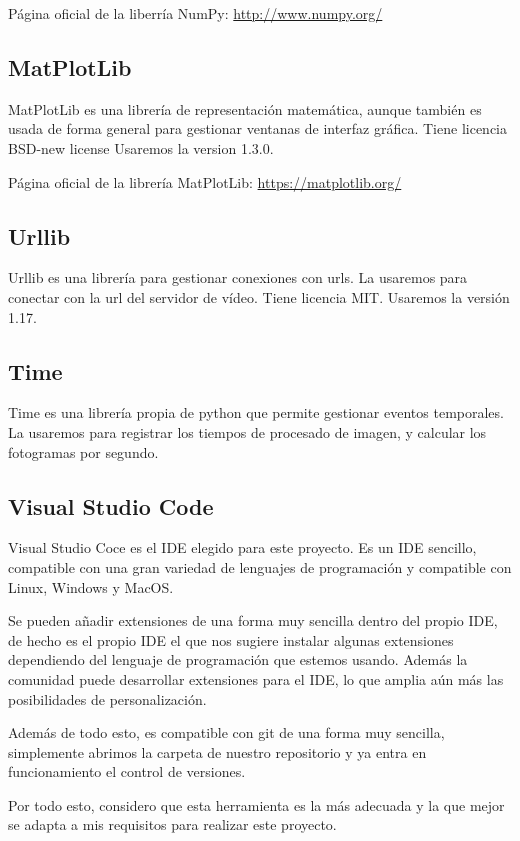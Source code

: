 Página oficial de la liberría NumPy: \url{http://www.numpy.org/}

\subsection{MatPlotLib}
MatPlotLib es una librería de representación matemática, aunque también es usada de forma general para gestionar ventanas de interfaz gráfica.
Tiene licencia BSD-new license
Usaremos la version 1.3.0.

Página oficial de la librería MatPlotLib: \url{https://matplotlib.org/}

\subsection{Urllib}
Urllib es una librería para gestionar conexiones con urls. La usaremos para conectar con la url del servidor de vídeo. 
Tiene licencia MIT.
Usaremos la versión 1.17.

\subsection{Time}
Time es una librería propia de python que permite gestionar eventos temporales. La usaremos para registrar los tiempos de procesado de imagen, y calcular los fotogramas por segundo. 


\subsection{Visual Studio Code}
Visual Studio Coce es el IDE elegido para este proyecto. Es un IDE sencillo, compatible con una gran variedad de lenguajes de programación y compatible con Linux, Windows y MacOS.
 
Se pueden añadir extensiones de una forma muy sencilla dentro del propio IDE, de hecho es el propio IDE el que nos sugiere instalar algunas extensiones dependiendo del lenguaje de programación que estemos usando. Además la comunidad puede desarrollar extensiones para el IDE, lo que amplia aún más las posibilidades de personalización.

Además de todo esto, es compatible con git de una forma muy sencilla, simplemente abrimos la carpeta de nuestro repositorio y ya entra en funcionamiento el control de versiones.

Por todo esto, considero que esta herramienta es la más adecuada y la que mejor se adapta a mis requisitos para realizar este proyecto.

